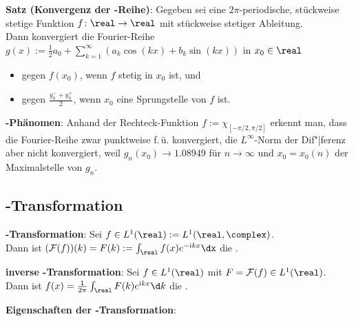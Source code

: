 \textbf{Satz (Konvergenz der -Reihe)}:
Gegeben sei eine $2\pi$-periodische, stückweise stetige Funktion $f\colon \real \to \real$
mit stückweise stetiger Ableitung.\\
Dann konvergiert die Fourier-Reihe
$g(x) := \frac{1}{2} a_0 + \sum_{k=1}^\infty (a_k\cos(kx) + b_k\sin(kx))$ in $x_0 \in \real$
\begin{itemize}
    \item
    gegen $f(x_0)$, wenn $f$ stetig in $x_0$ ist, und

    \item
    gegen $\frac{y_0^- + y_0^+}{2}$, wenn $x_0$ eine Sprungstelle von $f$ ist.
\end{itemize}

\textbf{-Phänomen}:
Anhand der Rechteck-Funktion $f := \chi_{[-\pi/2,\pi/2]}$ erkennt man,
dass die Fourier-Reihe zwar punktweise f.\,ü. konvergiert,
die $L^\infty$-Norm der Dif"|ferenz aber nicht konvergiert,
weil $g_n(x_0) \to 1.08949$ für $n \to \infty$ und $x_0 = x_0(n)$ der Maximalstelle von $g_n$.

\pagebreak

\subsection{%
    -Transformation%
}

\textbf{-Transformation}:
Sei $f \in L^1(\real) := L^1(\real, \complex)$.\\
Dann ist $(\F(f))(k) = F(k) := \int_\real f(x)e^{-\iu kx} \dx$
die .

\textbf{inverse -Transformation}:
Sei $f \in L^1(\real)$ mit $F = \F(f) \in L^1(\real)$.\\
Dann ist $f(x) = \frac{1}{2\pi} \int_\real F(k) e^{\iu kx}\d k$ die
.

\textbf{Eigenschaften der -Transformation}:

